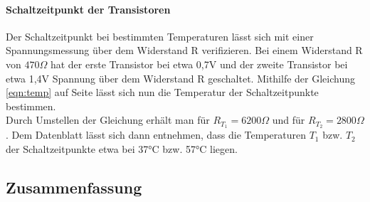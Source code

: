 \paragraph{Schaltzeitpunkt der Transistoren}

Der Schaltzeitpunkt bei bestimmten Temperaturen lässt sich mit einer Spannungsmessung über dem Widerstand R verifizieren. Bei einem Widerstand R von \(470\Omega\) hat der erste Transistor bei etwa 0,7V und der zweite Transistor bei etwa 1,4V Spannung über dem Widerstand R geschaltet. 
Mithilfe der Gleichung \ref{eqn:temp} auf Seite \pageref{eqn:temp} lässt sich nun die Temperatur der Schaltzeitpunkte bestimmen.\\
Durch Umstellen der Gleichung erhält man für \(R_{T_1} = 6200\Omega\) und für \(R_{T_2} = 2800\Omega\). Dem Datenblatt lässt sich dann entnehmen, dass die Temperaturen \(T_1\) bzw. \(T_2\) der Schaltzeitpunkte etwa bei 37°C bzw. 57°C liegen.

\subsection{Zusammenfassung}


